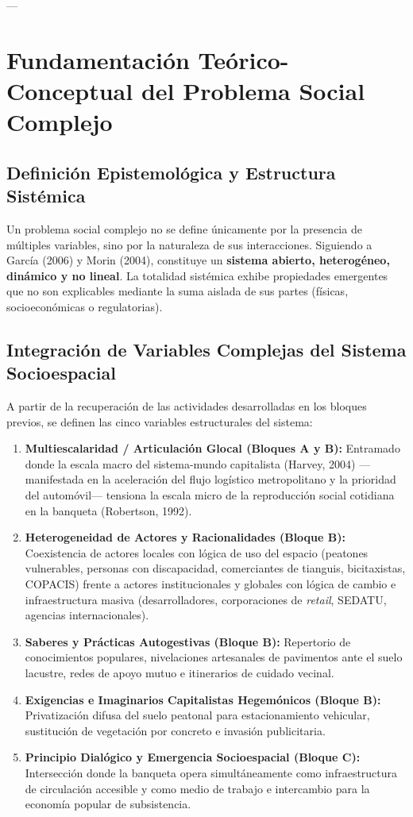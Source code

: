 \documentclass[12pt,a4paper]{article}
\begin{document}
---

\section{Fundamentación Teórico-Conceptual del Problema Social Complejo}

\subsection{Definición Epistemológica y Estructura Sistémica}
Un problema social complejo no se define únicamente por la presencia de múltiples variables, sino por la naturaleza de sus interacciones. Siguiendo a García (2006) y Morin (2004), constituye un \textbf{sistema abierto, heterogéneo, dinámico y no lineal}. La totalidad sistémica exhibe propiedades emergentes que no son explicables mediante la suma aislada de sus partes (físicas, socioeconómicas o regulatorias).

\subsection{Integración de Variables Complejas del Sistema Socioespacial}
A partir de la recuperación de las actividades desarrolladas en los bloques previos, se definen las cinco variables estructurales del sistema:

\begin{enumerate}[label=\textbf{\arabic*.}]
    \item \textbf{Multiescalaridad / Articulación Glocal (Bloques A y B):} Entramado donde la escala macro del sistema-mundo capitalista (Harvey, 2004) —manifestada en la aceleración del flujo logístico metropolitano y la prioridad del automóvil— tensiona la escala micro de la reproducción social cotidiana en la banqueta (Robertson, 1992).
    \item \textbf{Heterogeneidad de Actores y Racionalidades (Bloque B):} Coexistencia de actores locales con lógica de uso del espacio (peatones vulnerables, personas con discapacidad, comerciantes de tianguis, bicitaxistas, COPACIS) frente a actores institucionales y globales con lógica de cambio e infraestructura masiva (desarrolladores, corporaciones de \textit{retail}, SEDATU, agencias internacionales).
    \item \textbf{Saberes y Prácticas Autogestivas (Bloque B):} Repertorio de conocimientos populares, nivelaciones artesanales de pavimentos ante el suelo lacustre, redes de apoyo mutuo e itinerarios de cuidado vecinal.
    \item \textbf{Exigencias e Imaginarios Capitalistas Hegemónicos (Bloque B):} Privatización difusa del suelo peatonal para estacionamiento vehicular, sustitución de vegetación por concreto e invasión publicitaria.
    \item \textbf{Principio Dialógico y Emergencia Socioespacial (Bloque C):} Intersección donde la banqueta opera simultáneamente como infraestructura de circulación accesible y como medio de trabajo e intercambio para la economía popular de subsistencia.
\end{enumerate}
\end{document}
